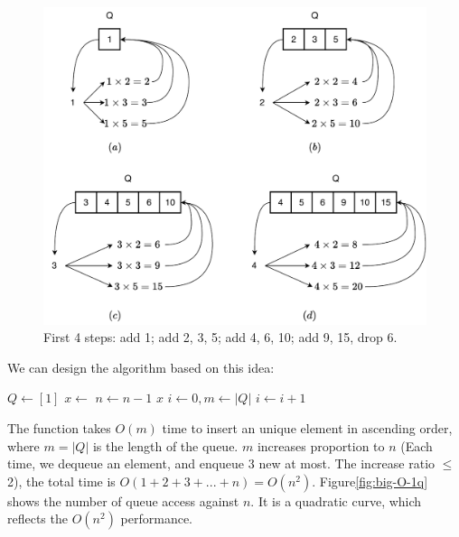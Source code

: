\documentclass[b5paper]{article}
\begin{document}
\begin{figure}[htbp]
  \centering
  \includegraphics[scale=0.5]{img/regular-num-1q}
  \caption{First 4 steps: add 1; add 2, 3, 5; add 4, 6, 10; add 9, 15, drop 6.}
  \label{fig:queues}
\end{figure}

We can design the algorithm based on this idea:

\begin{algorithmic}[1]
  \State $Q \gets [1]$
    \State $x \gets$ 
    \State {}
    \State {}
    \State {}
    \State $n \gets n-1$
  \EndWhile
  \State \Return $x$
\EndFunction
\Statex
{}
  \State $i \gets 0, m \gets |Q|$
    \State $i \gets i + 1$
  \EndWhile
    \State {}
  \EndIf
\EndFunction
\end{algorithmic}

The  function takes $O(m)$ time to insert an unique element in ascending order, where $m = |Q|$ is the length of the queue. $m$ increases proportion to $n$ (Each time, we dequeue an element, and enqueue 3 new at most. The increase ratio $\leq$ 2), the total time is $O(1 + 2 + 3 + ... + n) = O(n^2)$. Figure\cref{fig:big-O-1q} shows the number of queue access against $n$. It is a quadratic curve, which reflects the $O(n^2)$ performance.
\end{document}
